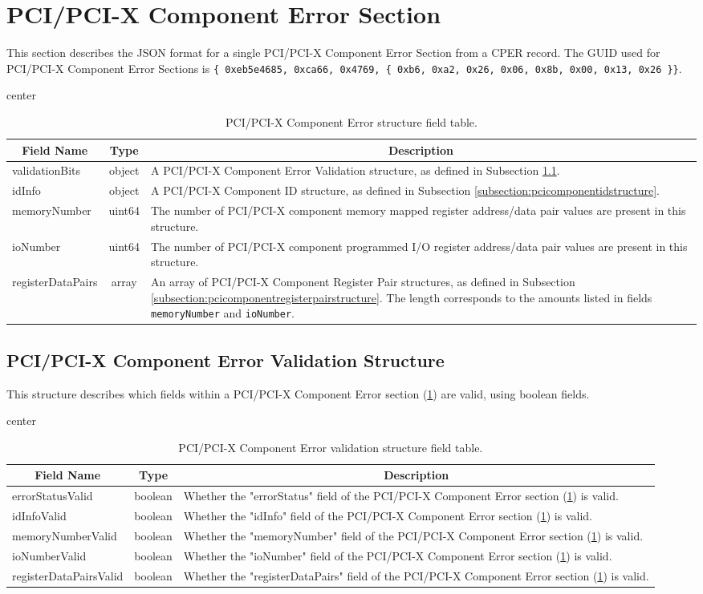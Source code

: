 \documentclass{report}
\newcommand*{\thead}[1]{\multicolumn{1}{|c|}{\bfseries #1}}
\newcommand*{\jsontable}[1]{
    \begin{table}[!ht]
    \label{#1}
    \centering
    \begin{adjustbox}{center}
    \begin{tabular}{|l|c|p{8cm}|}
    \hline
    \thead{Field Name} & \thead{Type} & \thead{Description} \\
    \hline
}
\newcommand*{\jsontableend}[1]{
    \hline
    \end{tabular}
    \end{adjustbox}
    \caption{#1}
    \label{table:#1}
    \end{table}
    \FloatBarrier
}
\begin{document}
\section{PCI/PCI-X Component Error Section}
\label{section:pcicomponenterrorsection}
This section describes the JSON format for a single PCI/PCI-X Component Error Section from a CPER record. The GUID used for PCI/PCI-X Component Error Sections is \texttt{\{ 0xeb5e4685, 0xca66, 0x4769, \{ 0xb6, 0xa2, 0x26, 0x06, 0x8b, 0x00, 0x13, 0x26 \}\}}.
\jsontable{table:pcicomponenterrorsection}
validationBits & object & A PCI/PCI-X Component Error Validation structure, as defined in Subsection \ref{subsection:pcicomponenterrorvalidationstructure}.\\
\hline
idInfo & object & A PCI/PCI-X Component ID structure, as defined in Subsection \ref{subsection:pcicomponentidstructure}.\\
\hline
memoryNumber & uint64 & The number of PCI/PCI-X component memory mapped register address/data pair values are present in this structure.\\
\hline
ioNumber & uint64 & The number of PCI/PCI-X component programmed I/O register address/data pair values are present in this structure.\\
\hline
registerDataPairs & array & An array of PCI/PCI-X Component Register Pair structures, as defined in Subsection \ref{subsection:pcicomponentregisterpairstructure}. The length corresponds to the amounts listed in fields \texttt{memoryNumber} and \texttt{ioNumber}.\\
\jsontableend{PCI/PCI-X Component Error structure field table.}

\subsection{PCI/PCI-X Component Error Validation Structure}
\label{subsection:pcicomponenterrorvalidationstructure}
This structure describes which fields within a PCI/PCI-X Component Error section (\ref{section:pcicomponenterrorsection}) are valid, using boolean fields.
\jsontable{table:pcicomponenterrorvalidationstructure}
errorStatusValid & boolean & Whether the "errorStatus" field of the PCI/PCI-X Component Error section (\ref{section:pcicomponenterrorsection}) is valid.\\
\hline
idInfoValid & boolean & Whether the "idInfo" field of the PCI/PCI-X Component Error section (\ref{section:pcicomponenterrorsection}) is valid.\\
\hline
memoryNumberValid & boolean & Whether the "memoryNumber" field of the PCI/PCI-X Component Error section (\ref{section:pcicomponenterrorsection}) is valid.\\
\hline
ioNumberValid & boolean & Whether the "ioNumber" field of the PCI/PCI-X Component Error section (\ref{section:pcicomponenterrorsection}) is valid.\\
\hline
registerDataPairsValid & boolean & Whether the "registerDataPairs" field of the PCI/PCI-X Component Error section (\ref{section:pcicomponenterrorsection}) is valid.\\
\jsontableend{PCI/PCI-X Component Error validation structure field table.}
\end{document}

